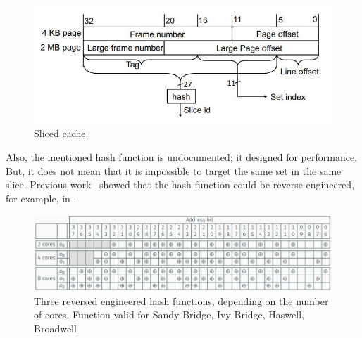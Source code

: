 \begin{figure}[!ht]
    \centering
    \includegraphics[width=\textwidth]{images/chapter_6/slicedcache.JPG}
    \caption{Sliced cache.}
    \label{fig:slicedcache}
\end{figure}

Also, the mentioned hash function is undocumented; it designed for
performance. But, it does not mean that it is impossible to target the same set in the same slice. Previous work~\cite{EURECOM+4671} showed that the hash function could be reverse engineered, for example, in .

\begin{figure}[!ht]
    \centering
    \includegraphics[width=\textwidth]{images/chapter_6/hashfunc.JPG}
    \caption{Three reversed engineered hash functions, depending on the number of cores. Function valid for Sandy Bridge, Ivy Bridge, Haswell, Broadwell}
    \label{fig:hashfunc}
\end{figure}

